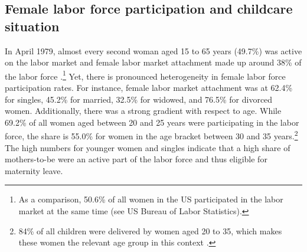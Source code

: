 \documentclass[11pt, a4paper]{article} %
\begin{document}
\subsection{Female labor force participation and childcare situation}
In April 1979, almost every second woman aged 15 to 65 years (49.7\%) was active on the labor market and female labor market attachment made up around 38\% of the labor force \citep{federalstatisticaloffice1981yearbook}.\footnote{As a comparison, 50.6\% of all women in the US participated in the labor market at the same time (see US Bureau of Labor Statistics).} Yet, there is pronounced heterogeneity in female labor force participation rates. For instance, female labor market attachment was at 62.4\% for singles, 45.2\% for married, 32.5\% for widowed, and 76.5\% for divorced women. Additionally, there was a strong gradient with respect to age. While 69.2\% of all women aged between 20 and 25 years were participating in the labor force, the share is 55.0\% for women in the age bracket between 30 and 35 years.\footnote{84\% of all children were delivered by
women aged 20 to 35, which makes these women the relevant age group in this context \citep{federalstatisticaloffice1981yearbook}.} The high numbers for younger women and singles indicate that a high share of mothers-to-be were an active part of the labor force and thus eligible for maternity leave. \newline 
\end{document}
